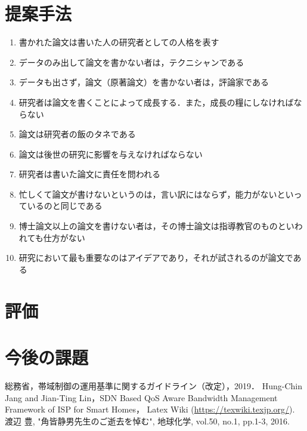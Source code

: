 \documentclass[a4paper,10pt,twocolumn,uplatex]{jsarticle}
\begin{document}
\section{提案手法}

\begin{enumerate} %
  \item 書かれた論文は書いた人の研究者としての人格を表す
  \item データのみ出して論文を書かない者は，テクニシャンである
  \item データも出さず，論文（原著論文）を書かない者は，評論家である
  \item 研究者は論文を書くことによって成長する．また，成長の糧にしなければならない
  \item 論文は研究者の飯のタネである
  \item 論文は後世の研究に影響を与えなければならない
  \item 研究者は書いた論文に責任を問われる
  \item 忙しくて論文が書けないというのは，言い訳にはならず，能力がないといっているのと同じである
  \item 博士論文以上の論文を書けない者は，その博士論文は指導教官のものといわれても仕方がない
  \item 研究において最も重要なのはアイデアであり，それが試されるのが論文である
\end{enumerate}

\section{評価}

\section{今後の課題}

\footnotesize{
  \begin{thebibliography}{99}
     総務省，帯域制御の運用基準に関するガイドライン（改定），2019．
     Hung-Chin Jang and Jian-Ting Lin，SDN Based QoS Aware Bandwidth Management Framework of ISP for Smart Homes，
     Latex Wiki (\url{https://texwiki.texjp.org/}).
     渡辺 豊, "角皆静男先生のご逝去を悼む", 地球化学, vol.50, no.1, pp.1-3, 2016.
  \end{thebibliography}
}

\end{document}
